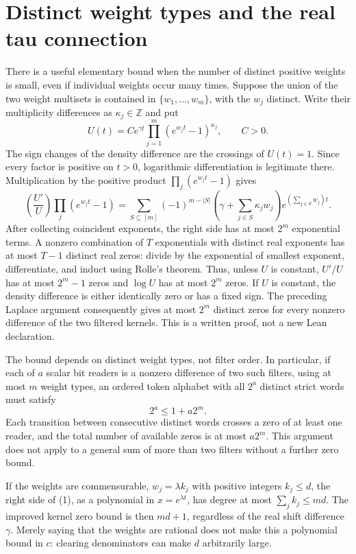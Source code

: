 \documentclass[11pt]{article}
\begin{document}
\section{Distinct weight types and the real tau connection}

There is a useful elementary bound when the number of distinct positive
weights is small, even if individual weights occur many times. Suppose
the union of the two weight multisets is contained in
$\{w_1,\ldots,w_m\}$, with the $w_j$ distinct. Write their multiplicity
differences as $\kappa_j\in\mathbb Z$ and put
\[
 U(t)=C e^{\gamma t}\prod_{j=1}^m(e^{w_jt}-1)^{\kappa_j},
 \qquad C>0.
\]
The sign changes of the density difference are the crossings of
$U(t)=1$. Since every factor is positive on $t>0$, logarithmic
differentiation is legitimate there. Multiplication by the positive
product $\prod_j(e^{w_jt}-1)$ gives
\[
 \left(\frac{U'}U\right)\prod_j(e^{w_jt}-1)
 =\sum_{S\subseteq[m]}(-1)^{m-|S|}
       \left(\gamma+\sum_{j\in S}\kappa_jw_j\right)
       e^{(\sum_{j\in S}w_j)t}.
 \tag{1}
\]
After collecting coincident exponents, the right side has at most
$2^m$ exponential terms. A nonzero combination of $T$ exponentials
with distinct real exponents has at most $T-1$ distinct real zeros:
divide by the exponential of smallest exponent, differentiate, and
induct using Rolle's theorem. Thus, unless $U$ is constant, $U'/U$
has at most $2^m-1$ zeros and $\log U$ has at most $2^m$ zeros.
If $U$ is constant, the density difference is either identically zero
or has a fixed sign. The preceding Laplace argument consequently gives
at most $2^m$ distinct zeros for every nonzero difference of the two
filtered kernels. This is a written proof, not a new Lean declaration.

The bound depends on distinct weight types, not filter order. In
particular, if each of $a$ scalar bit readers is a nonzero difference
of two such filters, using at most $m$ weight types, an ordered token
alphabet with all $2^a$ distinct strict words must satisfy
\[
 2^a\leq1+a2^m.
\]
Each transition between consecutive distinct words crosses a zero of
at least one reader, and the total number of available zeros is at most
$a2^m$. This argument does not apply to a general sum of more than two
filters without a further zero bound.

If the weights are commensurable, $w_j=\lambda k_j$ with positive
integers $k_j\leq d$, the right side of (1), as a polynomial in
$x=e^{\lambda t}$, has degree at most $\sum_j k_j\leq md$.
The improved kernel zero bound is then $md+1$, regardless of the real
shift difference $\gamma$. Merely saying that the weights are rational
does not make this a polynomial bound in $c$: clearing denominators
can make $d$ arbitrarily large.
\end{document}
